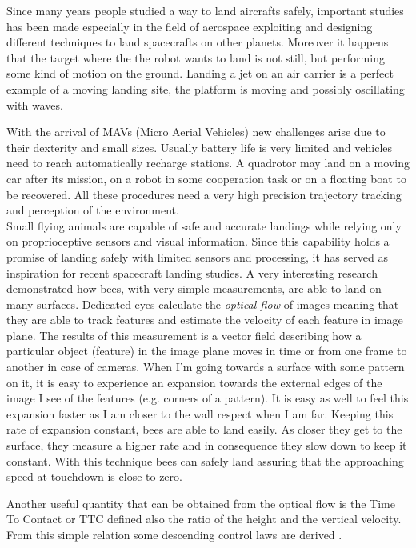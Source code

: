 Since many years people studied a way to land aircrafts safely, important studies has been made especially in the field of aerospace exploiting and designing different techniques to land spacecrafts on other planets. Moreover it happens that the target where the the robot wants to land is not still, but performing some kind of motion on the ground. Landing a jet on an air carrier is a perfect example of a moving landing site, the platform is moving and possibly oscillating with waves.\par With the arrival of MAVs (Micro Aerial Vehicles) new challenges arise due to their dexterity and small sizes. Usually battery life is very limited and vehicles need to reach automatically recharge stations. A quadrotor may land on a moving car after its mission, on a robot in some cooperation task or on a floating boat to be recovered. All these procedures need a very high precision trajectory tracking and  perception of the environment.\\

\noindent
Small flying animals are capable of safe and accurate landings while relying only on proprioceptive sensors and visual information. Since this capability holds a promise of landing safely with limited sensors and processing, it has served as inspiration for recent spacecraft landing studies\cite{Izzo2012}. A very interesting research \cite{Baird2013} demonstrated how bees, with very simple measurements, are able to land on many surfaces. Dedicated eyes calculate the \textit{optical flow} of images meaning that they are able to track features and estimate the velocity of each feature in image plane. The results of this measurement is a vector field describing how a particular object (feature) in the image plane moves in time or from one frame to another in case of cameras. When I'm going towards a surface with some pattern on it, it is easy to experience an expansion towards the external edges of the image I see of the features (e.g. corners of a pattern). It is easy as well to feel this expansion faster as I am closer to the wall respect when I am far. Keeping this rate of expansion constant, bees are able to land easily. As closer they get to the surface, they measure a higher rate and in consequence they slow down to keep it constant. With this technique bees can safely land assuring that the approaching speed at touchdown is close to zero. \par
Another useful quantity that can be obtained from the optical flow is the Time To Contact or TTC defined also the ratio of the height and the vertical velocity. From this simple relation some descending control laws are derived \cite{Croon2015}. \\

